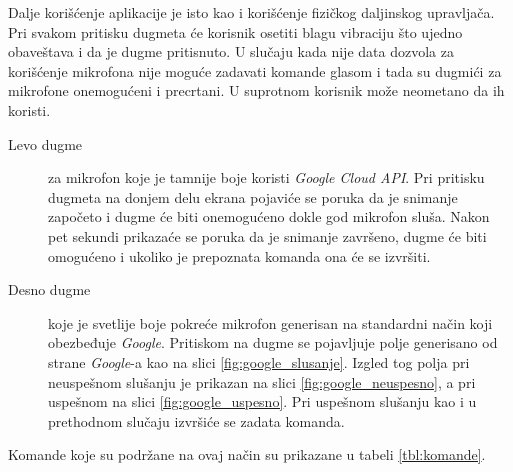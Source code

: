 \documentclass[implementacija.tex]{subfiles}
\begin{document}
Dalje korišćenje aplikacije je isto kao i korišćenje fizičkog daljinskog upravljača. Pri svakom pritisku dugmeta će korisnik osetiti blagu vibraciju što ujedno obaveštava i da je dugme pritisnuto. U slučaju kada nije data dozvola za korišćenje mikrofona nije moguće zadavati komande glasom i tada su dugmići za mikrofone onemogućeni i precrtani. U suprotnom korisnik može neometano da ih koristi.
\begin{description}
\item[Levo dugme] za mikrofon koje je tamnije boje koristi \textit{Google Cloud API}. Pri pritisku dugmeta na donjem delu ekrana pojaviće se poruka da je snimanje započeto i dugme će biti onemogućeno dokle god mikrofon sluša. Nakon pet sekundi prikazaće se poruka da je snimanje završeno, dugme će biti omogućeno i ukoliko je prepoznata komanda ona će se izvršiti.
\item[Desno dugme] koje je svetlije boje pokreće mikrofon generisan na standardni način koji obezbeđuje \textit{Google}. Pritiskom na dugme se pojavljuje polje generisano od strane \textit{Google}-a kao na slici \ref{fig:google_slusanje}. Izgled tog polja pri neuspešnom slušanju je prikazan na slici \ref{fig:google_neuspesno}, a pri uspešnom na slici \ref{fig:google_uspesno}. Pri uspešnom slušanju kao i u prethodnom slučaju izvršiće se zadata komanda.
\end{description}
Komande koje su podržane na ovaj način su prikazane u tabeli \ref{tbl:komande}.
\end{document}
